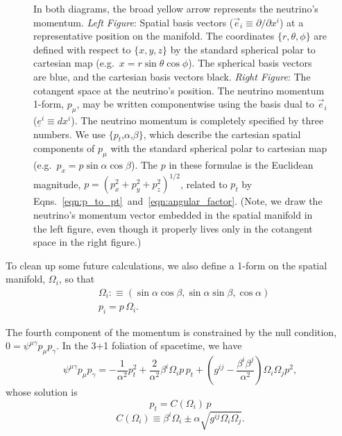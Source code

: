 \begin{figure}
\begin{subfigure}{.45\textwidth}
  \end{subfigure}
  \caption[Conventions for momentum components]{
    In both diagrams, the broad yellow arrow represents the neutrino's momentum.
    \emph{Left Figure}:
    Spatial basis vectors ($\vec{e}_i\equiv\partial/\partial x^i$)
    at a representative position on the manifold.
    The coordinates $\{r,\theta,\phi\}$ are defined with respect to
    $\{x,y,z\}$ by the standard spherical polar to cartesian map
    (e.g.\ $x=r\sin\theta\cos\phi$).
    The spherical basis vectors are blue, and the cartesian basis vectors black.
    \emph{Right Figure}:
    The cotangent space at the neutrino's position.
    The neutrino momentum 1-form, $p_\mu$,
    may be written componentwise using the basis dual to $\vec{e}_i$
    ($\underline{e}^i\equiv dx^i$).
    The neutrino momentum is completely specified by three numbers.
    We use $\{p_t$,$\alpha$,$\beta\}$, which describe the cartesian spatial
    components of $p_\mu$ with the standard spherical polar to cartesian map
    (e.g.\ $p_x=p\sin\alpha\cos\beta$).
    The $p$ in these formulae is the Euclidean magnitude,
    $p = (p_x^2+p_y^2+p_z^2)^{1/2}$, related to $p_t$ by
    Eqns.~\ref{eqn:p_to_pt}~and~\ref{eqn:angular_factor}.
    (Note, we draw the neutrino's momentum vector embedded in the
    spatial manifold in the left figure, even though it properly lives only in
    the cotangent space in the right figure.)
    }
  \label{fig:p_conventions}
\end{figure}

To clean up some future calculations, we also define a 1-form on the
spatial manifold, $\Omega_i$, so that
\begin{align}
  &\Omega_i :\equiv (\sin \alpha \cos \beta, \sin \alpha \sin \beta, \cos \alpha) \\
  &p_i = p\,\Omega_i.
\end{align}

The fourth component of the momentum is constrained by the null condition,
$0=\psi^{\mu\gamma}p_\mu p_\gamma$.
In the 3+1 foliation of spacetime, we have
\begin{equation}
  \psi^{\mu\gamma}p_\mu p_\gamma
  = -\frac{1}{\alpha^2} p_t^2 + \frac{2}{\alpha^2} \beta^i \Omega_i p\, p_t
  + (g^{ij}-\frac{\beta^i \beta^j}{\alpha^2}) \Omega_i \Omega_j p^2, \nonumber
\end{equation}
whose solution is
\begin{equation}
  \label{eqn:p_to_pt}
  p_t = C(\Omega_i) \, p
\end{equation}
\begin{equation}
  \label{eqn:angular_factor}
  C(\Omega_i) \equiv \beta^i \Omega_i \pm
  \alpha \sqrt{g^{ij} \Omega_i \Omega_j}.
\end{equation}

